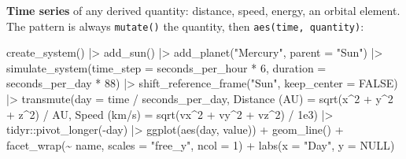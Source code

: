 \documentclass[
  10.5pt,
  letterpaper,
]{scrbook}
\newenvironment{Shaded}{\begin{snugshade}}{\end{snugshade}}
\newcommand{\AttributeTok}[1]{\textcolor[rgb]{0.00,0.00,0.00}{#1}}
\newcommand{\ConstantTok}[1]{\textcolor[rgb]{0.00,0.00,0.00}{#1}}
\newcommand{\DecValTok}[1]{\textcolor[rgb]{0.00,0.00,0.00}{#1}}
\newcommand{\FloatTok}[1]{\textcolor[rgb]{0.00,0.00,0.00}{#1}}
\newcommand{\FunctionTok}[1]{\textcolor[rgb]{0.00,0.00,0.00}{#1}}
\newcommand{\NormalTok}[1]{\textcolor[rgb]{0.00,0.00,0.00}{#1}}
\newcommand{\OtherTok}[1]{\textcolor[rgb]{0.00,0.00,0.00}{#1}}
\newcommand{\SpecialCharTok}[1]{\textcolor[rgb]{0.00,0.00,0.00}{#1}}
\newcommand{\StringTok}[1]{\textcolor[rgb]{0.00,0.00,0.00}{#1}}
\theoremstyle{definition}
\theoremstyle{plain}
\theoremstyle{remark}
\begin{document}
\textbf{Time series} of any derived quantity: distance, speed, energy,
an orbital element. The pattern is always \texttt{mutate()} the
quantity, then \texttt{aes(time,\ quantity)}:

\begin{Shaded}
\begin{Highlighting}[]
\FunctionTok{create\_system}\NormalTok{() }\SpecialCharTok{|\textgreater{}}
  \FunctionTok{add\_sun}\NormalTok{() }\SpecialCharTok{|\textgreater{}}
  \FunctionTok{add\_planet}\NormalTok{(}\StringTok{"Mercury"}\NormalTok{, }\AttributeTok{parent =} \StringTok{"Sun"}\NormalTok{) }\SpecialCharTok{|\textgreater{}}
  \FunctionTok{simulate\_system}\NormalTok{(}\AttributeTok{time\_step =}\NormalTok{ seconds\_per\_hour }\SpecialCharTok{*} \DecValTok{6}\NormalTok{, }\AttributeTok{duration =}\NormalTok{ seconds\_per\_day }\SpecialCharTok{*} \DecValTok{88}\NormalTok{) }\SpecialCharTok{|\textgreater{}}
  \FunctionTok{shift\_reference\_frame}\NormalTok{(}\StringTok{"Sun"}\NormalTok{, }\AttributeTok{keep\_center =} \ConstantTok{FALSE}\NormalTok{) }\SpecialCharTok{|\textgreater{}}
  \FunctionTok{transmute}\NormalTok{(}\AttributeTok{day =}\NormalTok{ time }\SpecialCharTok{/}\NormalTok{ seconds\_per\_day,}
            \StringTok{\textasciigrave{}}\AttributeTok{Distance (AU)}\StringTok{\textasciigrave{}} \OtherTok{=} \FunctionTok{sqrt}\NormalTok{(x}\SpecialCharTok{\^{}}\DecValTok{2} \SpecialCharTok{+}\NormalTok{ y}\SpecialCharTok{\^{}}\DecValTok{2} \SpecialCharTok{+}\NormalTok{ z}\SpecialCharTok{\^{}}\DecValTok{2}\NormalTok{) }\SpecialCharTok{/}\NormalTok{ AU,}
            \StringTok{\textasciigrave{}}\AttributeTok{Speed (km/s)}\StringTok{\textasciigrave{}}  \OtherTok{=} \FunctionTok{sqrt}\NormalTok{(vx}\SpecialCharTok{\^{}}\DecValTok{2} \SpecialCharTok{+}\NormalTok{ vy}\SpecialCharTok{\^{}}\DecValTok{2} \SpecialCharTok{+}\NormalTok{ vz}\SpecialCharTok{\^{}}\DecValTok{2}\NormalTok{) }\SpecialCharTok{/} \FloatTok{1e3}\NormalTok{) }\SpecialCharTok{|\textgreater{}}
\NormalTok{  tidyr}\SpecialCharTok{::}\FunctionTok{pivot\_longer}\NormalTok{(}\SpecialCharTok{{-}}\NormalTok{day) }\SpecialCharTok{|\textgreater{}}
  \FunctionTok{ggplot}\NormalTok{(}\FunctionTok{aes}\NormalTok{(day, value)) }\SpecialCharTok{+}
  \FunctionTok{geom\_line}\NormalTok{() }\SpecialCharTok{+}
  \FunctionTok{facet\_wrap}\NormalTok{(}\SpecialCharTok{\textasciitilde{}}\NormalTok{ name, }\AttributeTok{scales =} \StringTok{"free\_y"}\NormalTok{, }\AttributeTok{ncol =} \DecValTok{1}\NormalTok{) }\SpecialCharTok{+}
  \FunctionTok{labs}\NormalTok{(}\AttributeTok{x =} \StringTok{"Day"}\NormalTok{, }\AttributeTok{y =} \ConstantTok{NULL}\NormalTok{)}
\end{Highlighting}
\end{Shaded}
\end{document}
